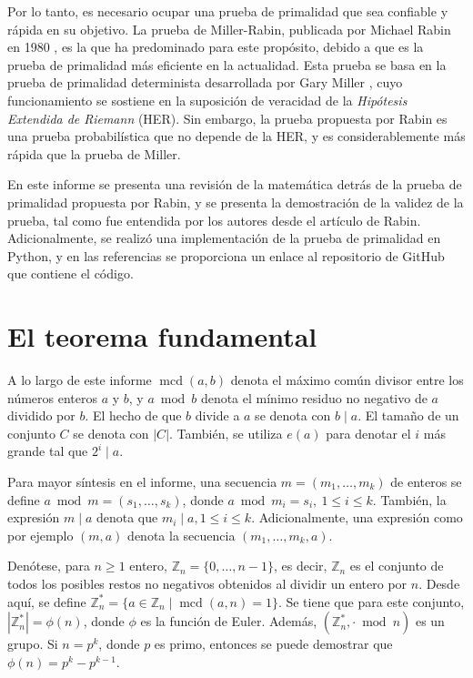 \documentclass[hidelinks, 12pt]{article}
\newcommand{\Z}{\mathbb{Z}}
\newcommand{\Zs}{\mathbb{Z}^*}
\DeclareMathOperator{\mcd}{mcd}
\begin{document}
Por lo tanto, es necesario ocupar una prueba de primalidad que sea confiable y rápida en su objetivo. La prueba de Miller-Rabin, publicada por Michael Rabin en 1980 \cite{Rabin}, es la que ha predominado para este propósito, debido a que es la prueba de primalidad más eficiente en la actualidad. Esta prueba se basa en la prueba de primalidad determinista desarrollada por Gary Miller \cite{Miller}, cuyo funcionamiento se sostiene en la suposición de veracidad de la \textit{Hipótesis Extendida de Riemann} (HER). Sin embargo, la prueba propuesta por Rabin es una prueba probabilística que no depende de la HER, y es considerablemente más rápida que la prueba de Miller.

En este informe se presenta una revisión de la matemática detrás de la prueba de primalidad propuesta por Rabin, y se presenta la demostración de la validez de la prueba, tal como fue entendida por los autores desde el artículo de Rabin. Adicionalmente, se realizó una implementación de la prueba de primalidad en Python, y en las referencias se proporciona un enlace al repositorio de GitHub que contiene el código.

\newpage
\tableofcontents

\newpage
\section{El teorema fundamental}


A lo largo de este informe $\mcd(a,b)$ denota el máximo común divisor entre los números enteros $a$ y $b$, y $a \bmod b$ denota el mínimo residuo no negativo de $a$ dividido por $b$. El hecho de que $b$ divide a $a$ se denota con $b\mid a$. El tamaño de un conjunto $C$ se denota con $|C|$. También, se utiliza $e(a)$ para denotar el $i$ más grande tal que $2^i\mid a$.

Para mayor síntesis en el informe, una secuencia $m=(m_1,\dots,m_k)$ de enteros se define $a\bmod m=(s_1,\dots,s_k)$, donde $a \bmod m_i=s_i,~1 \leq i \leq k$. También, la expresión $m\mid a$ denota que $m_i\mid a,1\leq i\leq k$. Adicionalmente, una expresión como por ejemplo $(m,a)$ denota la secuencia $(m_1,\dots,m_k,a)$.

Denótese, para $n\geq 1$ entero, $\Z_n=\{0,\dots,n-1\}$, es decir, $\Z_n$ es el conjunto de todos los posibles restos no negativos obtenidos al dividir un entero por $n$. Desde aquí, se define $\Zs_n=\{a\in \Z_n\mid\mcd(a,n)=1\}$. Se tiene que para este conjunto, $|\Zs_n|=\phi(n)$, donde $\phi$ es la función de Euler. Además, $(\Zs_n,\cdot\bmod n)$ es un grupo. Si $n=p^k$, donde $p$ es primo, entonces se puede demostrar que $\phi(n)=p^k-p^{k-1}$. 
\end{document}
